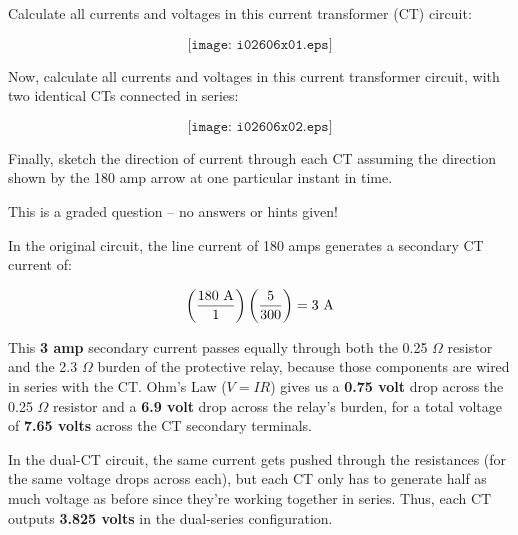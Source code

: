 

Calculate all currents and voltages in this current transformer (CT) circuit:

$$\texttt{[image: i02606x01.eps]}$$

\vskip 100pt

Now, calculate all currents and voltages in this current transformer circuit, with two identical CTs connected in series:

$$\texttt{[image: i02606x02.eps]}$$

\vskip 100pt

Finally, sketch the direction of current through each CT assuming the direction shown by the 180 amp arrow at one particular instant in time.

\vfil 

\eject






This is a graded question -- no answers or hints given!







In the original circuit, the line current of 180 amps generates a secondary CT current of:

$$\left( 180 \hbox{ A} \over 1 \right) \left(5 \over 300 \right) = 3 \hbox{ A}$$

This {\bf 3 amp} secondary current passes equally through both the 0.25 $\Omega$ resistor and the 2.3 $\Omega$ burden of the protective relay, because those components are wired in series with the CT.  Ohm's Law ($V = IR$) gives us a {\bf 0.75 volt} drop across the 0.25 $\Omega$ resistor and a {\bf 6.9 volt} drop across the relay's burden, for a total voltage of {\bf 7.65 volts} across the CT secondary terminals.

\vskip 40pt

In the dual-CT circuit, the same current gets pushed through the resistances (for the same voltage drops across each), but each CT only has to generate half as much voltage as before since they're working together in series.  Thus, each CT outputs {\bf 3.825 volts} in the dual-series configuration.

